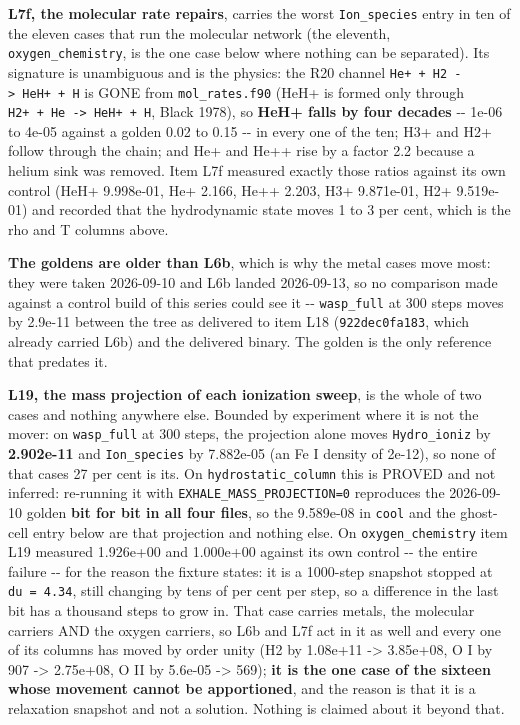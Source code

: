 \documentclass[english,a4paper]{my_memo}
\begin{document}
\textbf{L7f, the molecular rate repairs}, carries the worst \texttt{Ion\_species} entry in
ten of the eleven cases that run the molecular network (the eleventh,
\texttt{oxygen\_chemistry}, is the one case below where nothing can be separated). Its
signature is unambiguous and is the physics: the R20
channel \texttt{He+\ +\ H2\ -\textgreater{}\ HeH+\ +\ H} is GONE from \texttt{mol\_rates.f90} (HeH+ is formed
only through \texttt{H2+\ +\ He\ -\textgreater{}\ HeH+\ +\ H}, Black 1978), so \textbf{HeH+ falls by four
decades} -\/- 1e-06 to 4e-05 against a golden 0.02 to 0.15 -\/- in every one of
the ten; H3+ and H2+ follow through the chain; and He+ and He++ rise by a
factor 2.2 because a helium sink was removed. Item L7f measured exactly those
ratios against its own control (HeH+ 9.998e-01, He+ 2.166, He++ 2.203,
H3+ 9.871e-01, H2+ 9.519e-01) and recorded that the hydrodynamic state moves
1 to 3 per cent, which is the rho and T columns above.

\textbf{The goldens are older than L6b}, which is why the metal cases move most:
they were taken 2026-09-10 and L6b landed 2026-09-13, so no comparison made
against a control build of this series could see it -\/- \texttt{wasp\_full} at 300 steps
moves by 2.9e-11 between the tree as delivered to item L18 (\texttt{922dec0fa183},
which already carried L6b) and the delivered binary. The golden is the only
reference that predates it.

\textbf{L19, the mass projection of each ionization sweep}, is the whole of two
cases and nothing anywhere else. Bounded by experiment where it is not the
mover: on \texttt{wasp\_full} at 300 steps, the projection alone moves \texttt{Hydro\_ioniz}
by \textbf{2.902e-11} and \texttt{Ion\_species} by 7.882e-05 (an Fe I density of 2e-12), so
none of that case\textquotesingle s 27 per cent is its. On \texttt{hydrostatic\_column} this is PROVED and
not inferred: re-running it with \texttt{EXHALE\_MASS\_PROJECTION=0} reproduces the
2026-09-10 golden \textbf{bit for bit in all four files}, so the 9.589e-08 in
\texttt{cool} and the ghost-cell entry below are that projection and nothing else.
On \texttt{oxygen\_chemistry} item L19 measured 1.926e+00 and 1.000e+00 against its own
control -\/- the entire failure -\/- for the reason the fixture states: it is a
1000-step snapshot stopped at \texttt{du\ =\ 4.34}, still changing by tens of per cent
per step, so a difference in the last bit has a thousand steps to grow in.
That case carries metals, the molecular carriers AND the oxygen carriers, so
L6b and L7f act in it as well and every one of its columns has moved by order
unity (H2 by 1.08e+11 -\textgreater{} 3.85e+08, O I by 907 -\textgreater{} 2.75e+08, O II by 5.6e-05 -\textgreater{}
569); \textbf{it is the one case of the sixteen whose movement cannot be
apportioned}, and the reason is that it is a relaxation snapshot and not a
solution. Nothing is claimed about it beyond that.
\end{document}
